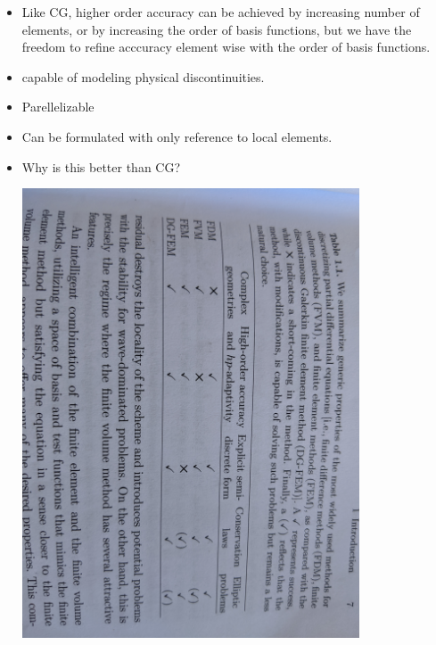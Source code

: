 \documentclass{article}
\begin{document}
\begin{itemize}
\item Like CG, higher order accuracy can be achieved by increasing number of elements, or by increasing the order of basis functions, but we have the freedom to refine acccuracy element wise with the order of basis functions.
\item capable of modeling physical discontinuities.

\item Parellelizable

\item Can be formulated with only reference to local elements.

\item Why is this better than CG?

\includegraphics[scale=.5, width=100mm]{table.jpg} 

  
  
\end{itemize}
\end{document}
